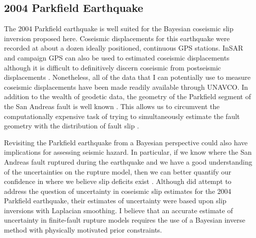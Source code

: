 \documentclass[12pt]{article}
\begin{document}
\subsection*{2004 Parkfield Earthquake}
The 2004 Parkfield earthquake is well suited for the Bayesian coseismic slip inversion proposed here.  Coseismic displacements for this earthquake were recorded at about a dozen ideally positioned, continuous GPS stations. InSAR and campaign GPS can also be used to estimated coseismic displacements although it is difficult to definitively discern coseismic from postseismic displacements \citep{Johanson2006}. Nonetheless, all of the data that I can potentially use to measure coseismic displacements have been made readily available through UNAVCO.  In addition to the wealth of geodetic data, the geometry of the Parkfield segment of the San Andreas fault is well known \citep{Simpson2006}.  This allows us to circumvent the computationally expensive task of trying to simultaneously estimate the fault geometry with the distribution of fault slip \citep[e.g.][]{Fukuda2008}. 

Revisiting the Parkfield earthquake from a Bayesian perspective could also have implications for assessing seismic hazard.  In particular, if we know where the San Andreas fault ruptured during the earthquake and we have a good understanding of the uncertainties on the rupture model, then we can better quantify our confidence in where we believe slip deficits exist \citep{Murray2006}.  Although \citet{Page2009} did attempt to address the question of uncertainty in coseismic slip estimates for the 2004 Parkfield earthquake, their estimates of uncertainty were based upon slip inversions with Laplacian smoothing.  I believe that an accurate estimate of uncertainty in finite-fault rupture models requires the use of a Bayesian inverse method with physically motivated prior constraints.
\end{document}
